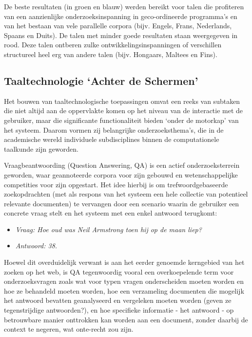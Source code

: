\documentclass[]{../../metanetpaper}
\begin{document}
\begin{multicols}{2}
    De beste resultaten (in groen en blauw) werden bereikt voor talen die profiteren van een aanzienlijke onderzoeksinspanning in geco-ordineerde programma's en van het bestaan van vele parallelle corpora (bijv. Engels, Frans, Nederlands, Spaans en Duits). De talen met minder goede resultaten staan weergegeven in rood. Deze talen ontberen zulke ontwikkelingsinspanningen of verschillen structureel heel erg van andere talen (bijv. Hongaars, Maltees en Fins).
    
\subsection{Taaltechnologie `Achter de Schermen' }

    Het bouwen van taaltechnologische toepassingen omvat een reeks van subtaken die niet altijd aan de oppervlakte komen op het niveau van de interactie met de gebruiker, maar die significante functionaliteit bieden `onder de motorkap' van het systeem. Daarom vormen zij belangrijke onderzoeksthema's, die in de academische wereld individuele subdisciplines binnen de computationele taalkunde zijn geworden.

    Vraagbeantwoording (Question Answering, QA) is een actief onderzoeksterrein geworden, waar geannoteerde corpora voor zijn gebouwd en wetenschappelijke competities voor zijn opgestart. Het idee hierbij is om trefwoordgebaseerde zoekopdrachten (met als respons van het systeem een hele collectie van potentieel relevante documenten) te vervangen door een scenario waarin de gebruiker een concrete vraag stelt en het systeem met een enkel antwoord terugkomt:

\begin{itemize}
\item[] \textit{Vraag: Hoe oud was Neil Armstrong toen hij op de maan liep?}
\item[] \textit{Antwoord: 38.}
\end{itemize}

 Hoewel dit overduidelijk verwant is aan het eerder genoemde kerngebied van het zoeken op het web, is QA tegenwoordig vooral een overkoepelende term voor onderzoeksvragen zoals wat voor typen vragen onderscheiden moeten worden en hoe ze behandeld moeten worden, hoe een verzameling documenten die mogelijk het antwoord bevatten geanalyseerd en vergeleken moeten worden (geven ze tegenstrijdige antwoorden?), en hoe specifieke informatie - het antwoord - op betrouwbare manier onttrokken kan worden aan een document, zonder daarbij de context te negeren, wat onte-recht zou zijn.


\end{multicols}
\end{document}
